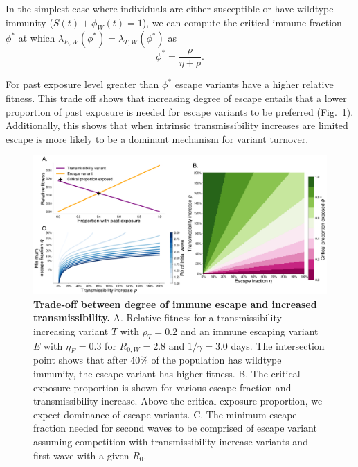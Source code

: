 \documentclass[11pt,oneside,letterpaper]{article}
\newcommand{\wt}{W}
\newcommand{\varE}{E}
\newcommand{\varT}{T}
\newcommand{\varEscape}{\eta}
\newcommand{\varTransmission}{\rho}
\begin{document}
In the simplest case where individuals are either susceptible or have wildtype immunity ($S(t) + \phi_{\wt}(t) = 1$), we can compute the critical immune fraction $\phi^{*}$ at which $\lambda_{\varE, \wt}(\phi^{*}) = \lambda_{\varT, \wt}(\phi^{*})$ as
\begin{equation} \label{eq:critical_immunity}
    \phi^{*} = \frac{\varTransmission}{\varEscape + \varTransmission}.
\end{equation}

For past exposure level greater than $\phi^{*}$ escape variants have a higher relative fitness.
This trade off shows that increasing degree of escape entails that a lower proportion of past exposure is needed for escape variants to be preferred (Fig.~\ref{fig:transmission_tradeoff}).
Additionally, this shows that when intrinsic transmissibility increases are limited escape is more likely to be a dominant mechanism for variant turnover.

\begin{figure}[h]
    \centering
    \includegraphics[width=1.0\linewidth]{./figures/transmission_tradeoff.png}
    \caption{
      \textbf{Trade-off between degree of immune escape and increased transmissibility.}
      A. Relative fitness for a transmissibility increasing variant $T$ with $\varTransmission_T=0.2$ and an immune escaping variant $E$ with $\varEscape_E=0.3$ for $R_{0, \wt}=2.8$ and $1 / \gamma = 3.0$ days.
      The intersection point shows that after 40\% of the population has wildtype immunity, the escape variant has higher fitness.
      B. The critical exposure proportion is shown for various escape fraction and transmissibility increase. Above the critical exposure proportion, we expect dominance of escape variants.
      C. The minimum escape fraction needed for second waves to be comprised of escape variant assuming competition with transmissibility increase variants and first wave with a given $R_{0}$.
    }
    \label{fig:transmission_tradeoff}
\end{figure}
\end{document}
